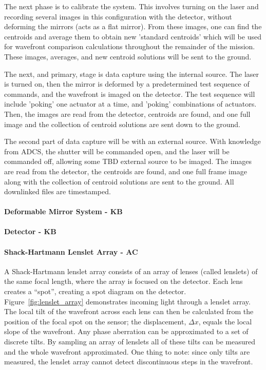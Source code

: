 \documentclass[12pt]{article}
\begin{document}
The next phase is to calibrate the system. This involves turning on the laser and recording several images in this configuration with the detector, without deforming the mirrors (acts as a flat mirror). From these images, one can find the centroids and average them to obtain new 'standard centroids' which will be used for wavefront comparison calculations throughout the remainder of the mission. These images, averages, and new centroid solutions will be sent to the ground.

The next, and primary, stage is data capture using the internal source. The laser is turned on, then the mirror is deformed by a predetermined test sequence of commands, and the wavefront is imaged on the detector. The test sequence will include 'poking' one actuator at a time, and 'poking' combinations of actuators. Then, the images are read from the detector, centroids are found, and one full image and the collection of centroid solutions are sent down to the ground.

The second part of data capture will be with an external source. With knowledge from ADCS, the shutter will be commanded open, and the laser will be commanded off, allowing some TBD external source to be imaged. The images are read from the detector, the centroids are found, and one full frame image along with the collection of centroid solutions are sent to the ground. All downlinked files are timestamped.

\paragraph{Deformable Mirror System - KB}

\paragraph{Detector - KB}

\paragraph{Shack-Hartmann Lenslet Array - AC}

A Shack-Hartmann lenslet array consists of an array of lenses (called lenslets) of the same focal length, where the array is focused on the detector. Each lens creates a “spot”, creating a spot diagram on the detector. Figure~\ref{fig:lenslet_array} demonstrates incoming light through a lenslet array. The local tilt of the wavefront across each lens can then be calculated from the position of the focal spot on the sensor; the displacement, $\Delta x$, equals the local slope of the wavefront. Any phase aberration can be approximated to a set of discrete tilts. By sampling an array of lenslets all of these tilts can be measured and the whole wavefront approximated. One thing to note: since only tilts are measured, the lenslet array cannot detect discontinuous steps in the wavefront.
\end{document}
